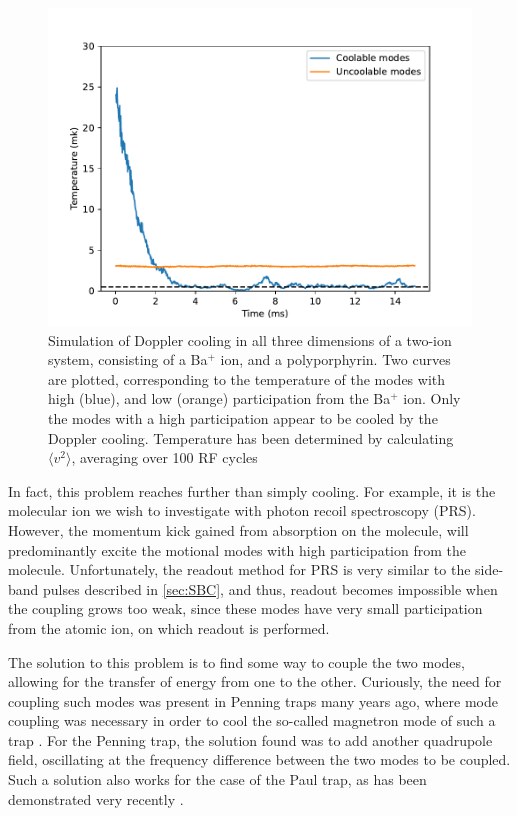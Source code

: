 \begin{figure}
    \centering
    \includegraphics[width = \textwidth]{main/WCM_SCM_Temp.pdf}
    \caption{Simulation of Doppler cooling in all three dimensions of a two-ion system, consisting of a Ba$^+$ ion, and a polyporphyrin. Two curves are plotted, corresponding to the temperature of the modes with high (blue), and low (orange) participation from the Ba$^+$ ion. Only the modes with a high participation appear to be cooled by the Doppler cooling. Temperature has been determined by calculating $\langle v^2\rangle$, averaging over 100 RF cycles}
    \label{fig:WCMSCM}
\end{figure}

In fact, this problem reaches further than simply cooling. For example, it is the molecular ion we wish to investigate with photon recoil spectroscopy (PRS). However, the momentum kick gained from absorption on the molecule, will predominantly excite the motional modes with high participation from the molecule.
Unfortunately, the readout method for PRS is very similar to the side-band pulses described in \cref{sec:SBC}, and thus, readout becomes impossible when the coupling grows too weak, since these modes have very small participation from the atomic ion, on which readout is performed.


The solution to this problem is to find some way to couple the two modes, allowing for the transfer of energy from one to the other. Curiously, the need for coupling such modes was present in Penning traps many years ago, where mode coupling was necessary in order to cool the so-called magnetron mode of such a trap \cite{PenningTrap,DehmeltPenningCool}. For the Penning trap, the solution found was to add another quadrupole field, oscillating at the frequency difference between the two modes to be coupled. Such a solution also works for the case of the Paul trap, as has been demonstrated very recently \cite{WeaklyCoupled}.

